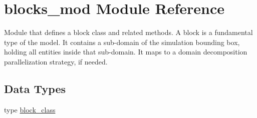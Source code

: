 \hypertarget{namespaceblocks__mod}{}\section{blocks\+\_\+mod Module Reference}
\label{namespaceblocks__mod}


Module that defines a block class and related methods. A block is a fundamental type of the model. It contains a sub-\/domain of the simulation bounding box, holding all entities inside that sub-\/domain. It maps to a domain decomposition parallelization strategy, if needed.  


\subsection*{Data Types}
\begin{DoxyCompactItemize}
\item 
type \hyperlink{structblocks__mod_1_1block__class}{block\+\_\+class}
\end{DoxyCompactItemize}
